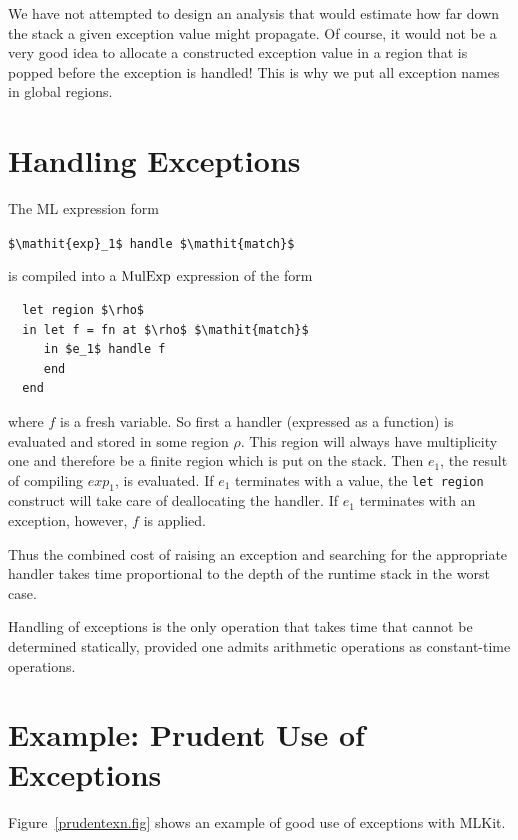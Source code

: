 \documentclass[12pt]{book}
\begin{document}
We have not attempted to design an analysis that would estimate how far down the
stack a given exception value might propagate. Of course, it would not be a very
good idea to allocate a constructed exception value in a region that is popped
before the exception is handled!  This is why we put all exception names in
%
%
%
global regions.

\section{Handling Exceptions}

The ML expression form
%
%
%
\begin{center}
  \lstinline!$\mathit{exp}_1$ handle $\mathit{match}$!
\end{center}
is compiled into a $\hbox{\rm MulExp}$ expression of the form
\begin{lstlisting}
  let region $\rho$
  in let f = fn at $\rho$ $\mathit{match}$
     in $e_1$ handle f
     end
  end
\end{lstlisting}
where $f$ is a fresh variable.  So first a handler (expressed as a function) is
evaluated and stored in some region $\rho$. This region will always have
multiplicity one and therefore be a finite region which is put on the stack.
Then $e_1$, the result of compiling $\mathit{exp}_1$, is evaluated.  If $e_1$
terminates with a value, the \lstinline!let region! construct will take care of
deallocating the handler.  If $e_1$ terminates with an exception, however, $f$
is applied.

Thus the combined cost of raising an exception and searching for the appropriate
handler takes time proportional to the depth of the runtime stack in the worst
case.

Handling of exceptions is the only operation that takes time that cannot be
determined statically, provided one admits arithmetic operations as
constant-time operations.

\section{Example: Prudent Use of Exceptions}

Figure~\ref{prudentexn.fig} shows an example of good use of exceptions with
MLKit.
%
%
%
%
\end{document}
